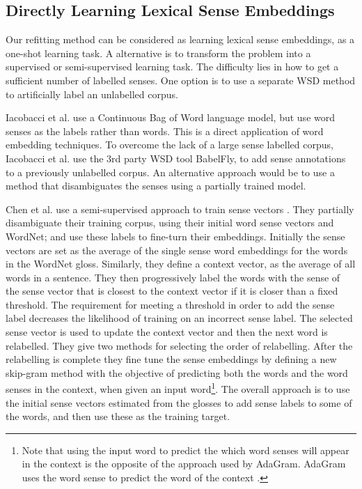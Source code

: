 \documentclass{sig-alternate}
\begin{document}
\subsection{Directly Learning Lexical Sense Embeddings}
Our refitting method can be considered as learning lexical sense embeddings, as a one-shot learning task. A alternative is to transform the problem into a supervised or semi-supervised learning task. The difficulty lies in how to get a sufficient number of labelled senses. One option is to use a separate WSD method to artificially label an unlabelled corpus.

Iacobacci et al. \parencite{iacobacci2015sensembed} use a Continuous Bag of Word language model\parencite{mikolov2013efficient}, but use word senses as the labels rather than words. This is a direct application of word embedding techniques. To overcome the lack of a large sense labelled corpus, Iacobacci et al. use the 3rd party WSD tool BabelFly, to add sense annotations to a previously unlabelled corpus. An alternative approach would be to use a method that disambiguates the senses using a partially trained model.

Chen et al. use a semi-supervised approach to train sense vectors \parencite{Chen2014}. They partially disambiguate their training corpus, using their initial word sense vectors and WordNet; and use these labels to fine-turn their embeddings.
Initially the sense vectors are set as the average of the single sense word embeddings\parencite{mikolov2013efficient} for the words in the WordNet gloss.
Similarly, they define a context vector, as the average of all words in a sentence.
They then progressively label the words with the sense of the sense vector that is closest to the context vector if it is closer than a fixed threshold.
The requirement for meeting a threshold in order to add the sense label  decreases the likelihood of training on an incorrect sense label.
The selected sense vector is used to update the context vector and then the next word is relabelled. They give two methods for selecting the order of relabelling.
After the relabelling is complete they fine tune the sense embeddings by defining a new skip-gram method with the objective of predicting both the words and the word senses in the context, when given an input word\footnote{Note that using the input word to predict the which word senses will appear in the context is the opposite of the approach used by AdaGram. AdaGram uses the word sense to predict the word of the context \parencite{AdaGrams}.}. The overall approach is to use the initial sense vectors estimated from the glosses to add sense labels to some of the words, and then use these as the training target.
\end{document}
